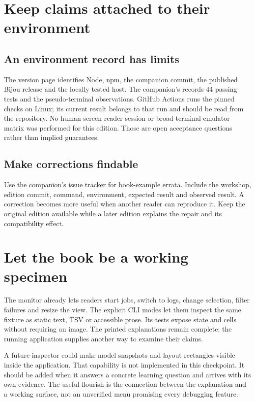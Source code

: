 \section{Keep claims attached to their environment}

\subsection{An environment record has limits}

The version page identifies Node, npm, the companion commit, the published Bijou release and the locally tested host. The companion's  records 44 passing tests and the pseudo-terminal observations. GitHub Actions runs the pinned checks on Linux; its current result belongs to that run and should be read from the repository. No human screen-reader session or broad terminal-emulator matrix was performed for this edition. Those are open acceptance questions rather than implied guarantees.

\subsection{Make corrections findable}

Use the companion's issue tracker for book-example errata. Include the workshop, edition commit, command, environment, expected result and observed result. A correction becomes more useful when another reader can reproduce it. Keep the original edition available while a later edition explains the repair and its compatibility effect.

\section{Let the book be a working specimen}

The monitor already lets readers start jobs, switch to logs, change selection, filter failures and resize the view. The explicit CLI modes let them inspect the same fixture as static text, TSV or accessible prose. Its tests expose state and cells without requiring an image. The printed explanations remain complete; the running application supplies another way to examine their claims.

A future inspector could make model snapshots and layout rectangles visible inside the application. That capability is not implemented in this checkpoint. It should be added when it answers a concrete learning question and arrives with its own evidence. The useful flourish is the connection between the explanation and a working surface, not an unverified menu promising every debugging feature.
